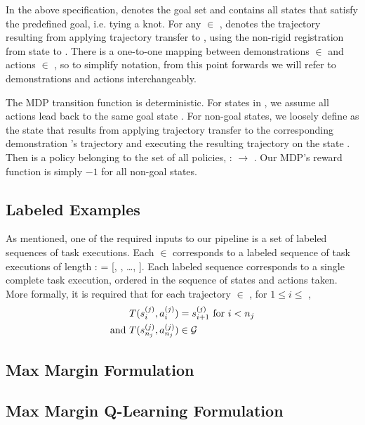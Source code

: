 In the above specification, \goalset{} denotes the goal set and contains all
states that satisfy the predefined goal, i.e. tying a knot.
For any \demovar{} $\in$ \demoset{},  denotes the trajectory
resulting from applying trajectory transfer to , using
the non-rigid registration from state  to \statevar{}.
There is a one-to-one mapping between demonstrations \demovar{}
$\in$ \demoset{} and actions \actionvar{} $\in$ \actionset{}, so to simplify
notation, from this point forwards we will refer to demonstrations and
actions interchangeably.

The MDP transition function \transitionfn{} is deterministic. For states
\statevar{} in \goalset{}, we assume all actions lead back to the same
goal state \statevar{}. For
non-goal states, we loosely define \policysub{\actionvar}{\statevar{}}
as the state that results from applying trajectory transfer to the corresponding
demonstration \demovar{}'s trajectory and executing the resulting trajectory
on the state \statevar{}. Then \policysub{\actionvar{}}{\statevar{}} is a
policy belonging to the set of all policies, \policyset{} : \transitionfn{}
 \stateset{} $\rightarrow$ \stateset{}. Our MDP's reward function is
simply $-1$ for all non-goal states.

\subsection{Labeled Examples}
\label{subsec:labeledex}

As mentioned, one of the required inputs to our pipeline is a set 
of labeled sequences of task executions. Each  $\in$ 
corresponds to a labeled sequence of
task executions of length :  = [,
, \ldots, ]. Each labeled sequence corresponds
to a single complete task execution, ordered in the sequence of states and
actions taken. More formally, it is required that for each trajectory
 $\in$ , for $1 \leq i \leq$ ,
\begin{align*}
T(s_{i}^{(j)}, a_{i}^{(j)}) &= s_{i+1}^{(j)} \text{ for } i < n_{j} \\
\text{and } T(s_{n_{j}}^{(j)}, a_{n_{j}}^{(j)}) &\in \mathcal{G}{}
\end{align*}

\subsection{Max Margin Formulation}


\subsection{Max Margin Q-Learning Formulation}
